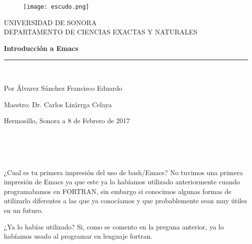 \documentclass[12pt,letterpaper]{article}
\begin{document}
\begin{portada}\begin{center}
\vspace*{-1in}
\begin{figure}[htb]
\begin{center}
\texttt{[image: escudo.png]}
\end{center}
\end{figure}

UNIVERSIDAD DE SONORA\\
\vspace*{0.15in}
DEPARTAMENTO DE CIENCIAS EXACTAS Y NATURALES \\
\vspace*{0.6in}

\begin{Large}
\textbf{Introducción a Emacs} \\
\end{Large}
\vspace*{0.3in}

\vspace*{0.3in}
\rule{80mm}{0.1mm}\\
\vspace*{0.1in}
\begin{large}
Por Álvarez Sánchez Francisco Eduardo
\end{large}

\begin{large}
Maestro: Dr. Carlos Lizárrga Celaya \\
\end{large}
\vspace*{5cm}
\begin{large}
Hermosillo, Sonora a 8 de Febrero de 2017
\end{large}
\end{center}
\thispagestyle{empty}





\\\\\\

\newpage

¿Cual es tu primera impresión del uso de bash/Emacs?
No tuvimos una primera impresión de Emacs ya que este ya lo habíamos utilizado anteriormente cuando programabamos en FORTRAN, sin embargo si conocimos algunas formas de utilizarlo diferentes a las que ya conocíamos y que probablemente sean muy útiles en un futuro. 


¿Ya lo habías utilizado? 
Si, como se comento en la preguna anterior, ya lo habíamos usado al programar en lenguaje fortran. 



\end{portada}
\end{document}

